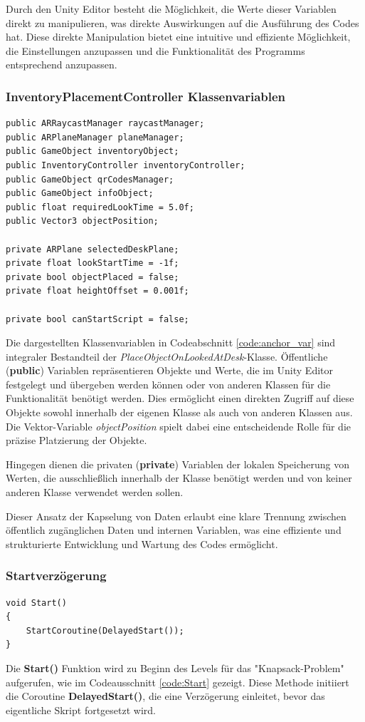 Durch den Unity Editor besteht die Möglichkeit, die Werte dieser Variablen direkt zu manipulieren, was direkte Auswirkungen
auf die Ausführung des Codes hat. Diese direkte Manipulation bietet eine intuitive und effiziente Möglichkeit, die Einstellungen
anzupassen und die Funktionalität des Programms entsprechend anzupassen.

\subsubsection{InventoryPlacementController Klassenvariablen}
\begin{lstlisting}[style=csharp, caption={Klassenvariablen der InventoryPlacementController Klasse}, label=code:anchor_var]
public ARRaycastManager raycastManager;
public ARPlaneManager planeManager;
public GameObject inventoryObject;
public InventoryController inventoryController;
public GameObject qrCodesManager;
public GameObject infoObject;
public float requiredLookTime = 5.0f;
public Vector3 objectPosition;

private ARPlane selectedDeskPlane;
private float lookStartTime = -1f;
private bool objectPlaced = false;
private float heightOffset = 0.001f;

private bool canStartScript = false;
\end{lstlisting}

Die dargestellten Klassenvariablen in Codeabschnitt \ref{code:anchor_var} sind integraler Bestandteil der
\textit{PlaceObjectOnLookedAtDesk}-Klasse. Öffentliche (\textbf{public}) Variablen repräsentieren Objekte und Werte, die
im Unity Editor festgelegt und übergeben werden können oder von anderen Klassen für die Funktionalität benötigt werden.
Dies ermöglicht einen direkten Zugriff auf diese Objekte sowohl innerhalb der eigenen Klasse als auch von anderen Klassen
aus. Die Vektor-Variable \textit{objectPosition} spielt dabei eine entscheidende Rolle für die präzise Platzierung der
Objekte.

Hingegen dienen die privaten (\textbf{private}) Variablen der lokalen Speicherung von Werten, die ausschließlich innerhalb
der Klasse benötigt werden und von keiner anderen Klasse verwendet werden sollen.

Dieser Ansatz der Kapselung von Daten erlaubt eine klare Trennung zwischen öffentlich zugänglichen Daten und internen
Variablen, was eine effiziente und strukturierte Entwicklung und Wartung des Codes ermöglicht.

\subsubsection{Startverzögerung}
\begin{lstlisting}[style=csharp, caption={Beginn des Inventory Placement Controllers}, label=code:Start]
void Start()
{
    StartCoroutine(DelayedStart());
}
\end{lstlisting}
Die \textbf{Start()} Funktion wird zu Beginn des Levels für das "Knapsack-Problem" aufgerufen, wie im Codeausschnitt
\ref{code:Start} gezeigt. Diese Methode initiiert die Coroutine \textbf{DelayedStart()}, die eine Verzögerung einleitet,
bevor das eigentliche Skript fortgesetzt wird.

